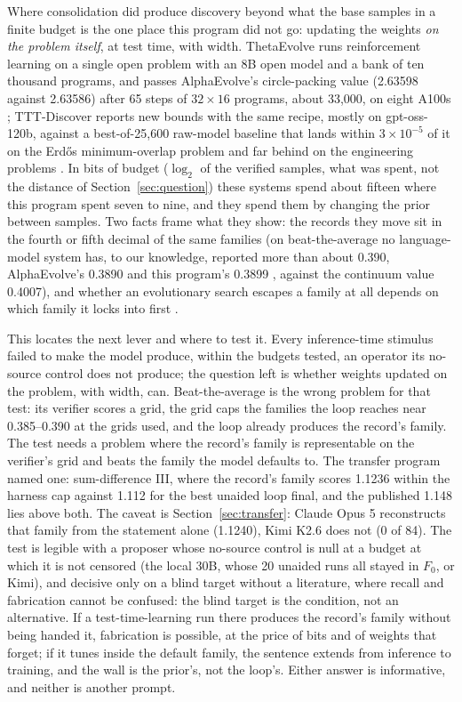 \documentclass[11pt]{article}
\begin{document}
Where consolidation did produce discovery beyond what the base samples in a
finite budget is the one place this program did not go: updating the
weights \emph{on the problem itself}, at test time, with width. ThetaEvolve
runs reinforcement learning on a single open problem with an 8B open model
and a bank of ten thousand programs, and passes AlphaEvolve's
circle-packing value (2.63598 against 2.63586) after 65 steps of
$32\times16$ programs, about 33{,}000, on eight A100s
\citep{wang2025thetaevolve}; TTT-Discover reports new bounds with the same
recipe, mostly on gpt-oss-120b, against a best-of-25{,}600 raw-model
baseline that lands within $3\times10^{-5}$ of it on the Erd\H{o}s
minimum-overlap problem and far behind on the engineering problems
\citep{yuksekgonul2026ttt}. In bits of budget ($\log_2$ of the verified
samples, what was spent, not the distance of Section~\ref{sec:question})
these systems spend about fifteen where this program spent seven to nine,
and they spend them by changing the prior between samples. Two facts frame
what they show: the records they move sit in the fourth or fifth decimal
of the same families (on beat-the-average no language-model system has, to
our knowledge, reported more than about 0.390, AlphaEvolve's 0.3890
\citep{georgiev2025exploration} and this program's 0.3899
\citep{ono2026operator}, against the continuum value 0.4007), and
whether an evolutionary search escapes a family at all depends on which
family it locks into first \citep[Appendix D.2, greedy
allocator]{xing2026base}.

This locates the next lever and where to test it. Every inference-time
stimulus failed to make the model produce, within the budgets tested, an
operator its no-source control does not produce; the question left is
whether weights updated on the problem, with width, can. Beat-the-average
is the wrong problem for that test: its verifier scores a grid, the grid
caps the families the loop reaches near 0.385--0.390 at the grids used, and
the loop already produces the record's family. The test needs a problem
where the record's family is representable on the verifier's grid and
beats the family the model defaults to. The transfer program named one:
sum-difference III, where the record's family scores 1.1236 within the
harness cap against 1.112 for the best unaided loop final, and the
published 1.148 lies above both. The caveat is
Section~\ref{sec:transfer}: Claude Opus 5 reconstructs that family from the
statement alone (1.1240), Kimi K2.6 does not (0 of 84). The test is
legible with a proposer whose no-source control is null at a budget at
which it is not censored (the local 30B, whose 20 unaided runs all
stayed in $F_0$, or Kimi), and decisive only on a blind target without a
literature, where recall and fabrication cannot be confused: the blind
target is the condition, not an alternative. If a test-time-learning run
there produces the record's family without being handed it, fabrication is
possible, at the price of bits and of weights that forget; if it tunes
inside the default family, the sentence extends from inference to training,
and the wall is the prior's, not the loop's. Either answer is informative,
and neither is another prompt.
\end{document}
